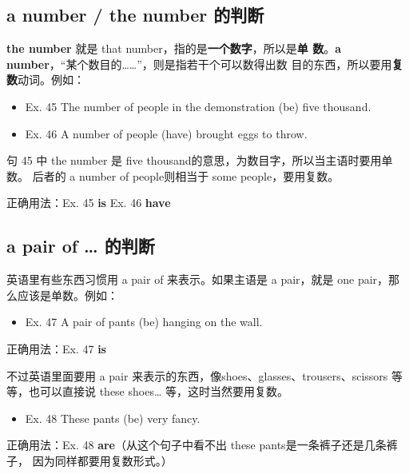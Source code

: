 \subsection{a number / the number 的判断}

\textbf{the number} 就是 that number，指的是\textbf{一个数字}，所以是\textbf{单
  数}。\textbf{a number}，“某个数目的\ldots\ldots{}”，则是指若干个可以数得出数
目的东西，所以要用\textbf{复数}动词。例如：
\begin{mybox}

\begin{itemize}
\item   Ex. 45 The number of people in the demonstration (be) five thousand.
\item   Ex. 46 A number of people (have) brought eggs to throw.
\end{itemize}

句 45 中 the number 是 five thousand的意思，为数目字，所以当主语时要用单数。
后者的 a number of people则相当于 some people，要用复数。

\tcblower

正确用法：Ex. 45 \textbf{is} \qquad\quad Ex. 46 \textbf{have}
\end{mybox}

\subsection{a pair of \ldots{} 的判断}

英语里有些东西习惯用 a pair of 来表示。如果主语是 a pair，就是 one
pair，那么应该是单数。例如：

\begin{mybox}

\begin{itemize}
\item   Ex. 47 A pair of pants (be) hanging on the wall.
\end{itemize}

\tcblower

正确用法：Ex. 47 \textbf{is}
\end{mybox}

不过英语里面要用 a pair 来表示的东西，像shoes、glasses、trousers、scissors 等
等，也可以直接说 these shoes\ldots{} 等，这时当然要用复数。

\begin{mybox}
\begin{itemize}
\item   Ex. 48 These pants (be) very fancy.
\end{itemize}

\tcblower

正确用法：Ex. 48 \textbf{are}（从这个句子中看不出 these pants是一条裤子还是几条裤子，
因为同样都要用复数形式。）
\end{mybox}

